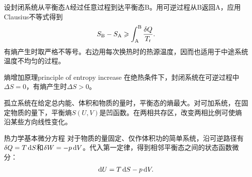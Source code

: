 \begin{corollary}
	设封闭系统从平衡态A经过任意过程到达平衡态B。用可逆过程从B返回A，应用Clausius不等式得到
	\begin{equation}
		\label{eq:sm-entropy-clausius-inequality}
		S_\mathrm{B} - S_\mathrm{A} \geqslant \int_\mathrm{A}^\mathrm{B}\frac{\mathop{}\!\delta Q}{T_\mathrm r} .
	\end{equation}
	有熵产生时取严格不等号。右边用每次换热时的热源温度，因而也适用于中途系统温度不均匀的过程。
\end{corollary}

\begin{theorem}
	{熵增加原理}{principle of entropy increase}
	在绝热条件下，封闭系统在可逆过程中$\Delta S = 0$，有熵产生时$\Delta S > 0$。
\end{theorem}

\begin{corollary}
	孤立系统在给定总内能、体积和物质的量时，平衡态的熵最大。对可加系统，在固定物质的量下，平衡熵$S(U,V)$是凹函数。在两相共存区，改变两相比例可使熵沿某些方向线性变化。
\end{corollary}




\begin{theorem}
	{热力学基本微分方程}{}
	对于物质的量固定、仅作体积功的简单系统，沿可逆路径有$\mathop{}\!\delta Q = T\mathop{}\!\mathrm{d} S$和$\mathop{}\!\delta W = -p\mathop{}\!\mathrm{d} V$。代入第一定律，得到相邻平衡态之间的状态函数微分：
	\begin{equation}
		\label{eqn:dU=TdS-pdV}
		\mathop{}\!\mathrm{d} U = T\mathop{}\!\mathrm{d} S - p\mathop{}\!\mathrm{d} V.
	\end{equation}
\end{theorem}

